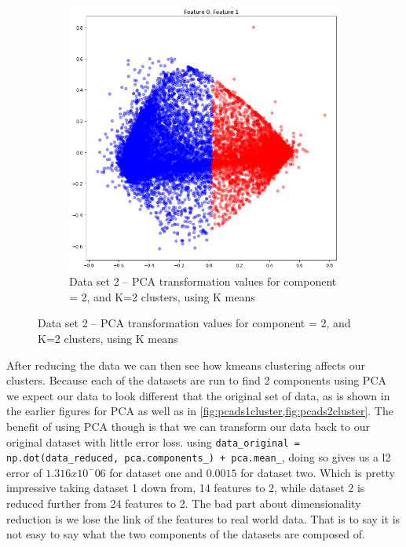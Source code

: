 \documentclass[
letterpaper, %
]{IEEEtran}
\begin{document}
	\begin{figure}[ht]\ContinuedFloat
		\begin{subfigure}{0.5\textwidth}
			\centering
			\includegraphics[width=\linewidth]{./images/ds2/pca/cluster/pcacluster.png}
			\caption{Data set 2 -- PCA transformation values for component = 2, and K=2 clusters, using K means}
			\label{fig:pcads2cluster}
		\end{subfigure}
	\end{figure}

	After reducing the data we can then see how kmeans clustering affects our clusters. Because each of the datasets are run to find 2 components using PCA we expect our data to look different that the original set of data, as is shown in the earlier figures for PCA as well as in \cref{fig:pcads1cluster,fig:pcads2cluster}. The benefit of using PCA though is that we can transform our data back to our original dataset with little error loss. using \lstinline|data_original = np.dot(data_reduced, pca.components_) + pca.mean_|, doing so gives us a l2 error of $1.316x10^-06$ for dataset one and $0.0015$ for dataset two. Which is pretty impressive taking dataset 1 down from, 14 features to 2, while dataset 2 is reduced further from 24 features to 2. The bad part about dimensionality reduction is we lose the link of the features to real world data. That is to say it is not easy to say what the two components of the datasets are composed of.
\end{document}
